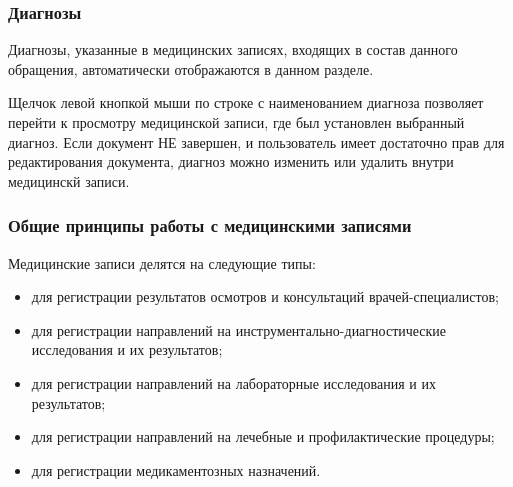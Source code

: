 {

\subsubsection{Диагнозы}

Диагнозы, указанные в медицинских записях, входящих в состав данного обращения, автоматически отображаются в данном разделе.

Щелчок левой кнопкой мыши по строке с наименованием диагноза позволяет перейти к просмотру медицинской записи, где был установлен выбранный диагноз. Если документ НЕ завершен, и пользователь имеет достаточно прав для редактирования документа, диагноз можно изменить или удалить внутри медицинскй записи.

\subsubsection{Общие принципы работы с медицинскими записями} \label{pol_obr_gen}

Медицинские записи делятся на следующие типы:
\begin{itemize}
 \item {} для регистрации результатов осмотров и консультаций врачей-специалистов;
 \item {} для регистрации направлений на инструментально-диагностические исследования и их результатов;
 \item {} для регистрации направлений на лабораторные исследования и их результатов;
 \item {} для регистрации направлений на лечебные и профилактические процедуры;
 \item {} для регистрации медикаментозных назначений. 
\end{itemize}

}
